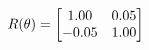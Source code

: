 \documentclass[preview]{standalone}
\begin{document}
\begin{align*}
\special{dvisvgm:raw <g id='unique000'>}R(\theta) = \begin{bmatrix}1.00 & 0.05\\-0.05 & 1.00\end{bmatrix}\special{dvisvgm:raw </g>}
\end{align*}
\end{document}

